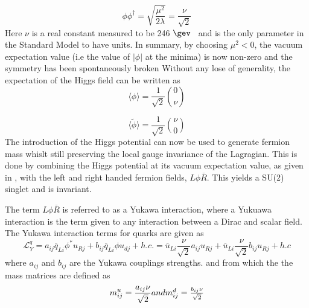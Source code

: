 \begin{equation}
  \phi\phi^{\dagger} = \sqrt{\frac{\mu^{2}}{2\lambda}} = \frac{\nu}{\sqrt{2}}
\end{equation}
Here $\nu$ is a real constant measured to be 246 $\gev$~\cite{vev} and is the only parameter in the Standard Model to have units. In summary, by choosing $\mu^{2}<0$, the vacuum expectation value (i.e the value of $|\phi|$ at the minima) is now non-zero and the symmetry has been spontaneously broken %
 Without any lose of generality, the expectation of the Higgs field can be written as
 \begin{equation}
   \label{eq:expt}
  \langle{\phi}\rangle = \frac{1}{\sqrt{2}}\binom{0}{\nu}  %
\end{equation}

\begin{equation}
  \langle\tilde{\phi}\rangle = \frac{1}{\sqrt{2}}\binom{\nu}{0}
\end{equation}
The introduction of the Higgs potential can now be used to generate fermion mass whislt still preserving the local gauge invariance of the Lagragian. This is done by combining the Higgs potential at its vacuum expectation value, as given in \label{eq:expt}, with the left and right handed fermion fields, $L\phi\overline{R}$. This yields a SU(2) singlet and is invariant. 

The term $L\phi\overline{R}$ is referred to as a Yukawa interaction, where a Yukuawa interaction is the term given to any interaction between a Dirac and scalar field.  The Yukawa interaction terms for quarks are given as
\begin{equation}
  \mathcal{L}^{q}_{Y} = a_{ij}\overline{q}_{Li}\phi^{*}u_{Rj} + b_{ij}\overline{q}_{Li}\phi u_{dj} + h.c.%
  =%
   \overline{u}_{Li}\frac{\nu}{\sqrt{2}}a_{ij}u_{Rj} + \overline{u}_{Li}\frac{\nu}{\sqrt{2}} b_{ij}u_{Rj} + h.c
\label{eq:yukawa}
\end{equation}
where $a_{ij}$ and $b_{ij}$ are the Yukawa couplings strengths.
and from which the the mass matrices are defined as
\begin{equation}
  m^{u}_{ij} = \frac{a_{ij}\nu}{\sqrt{2}} $$and$$ \\
  m^{d}_{ij} = \frac{b_{ij}\nu}{\sqrt{2}} 
\end{equation}

